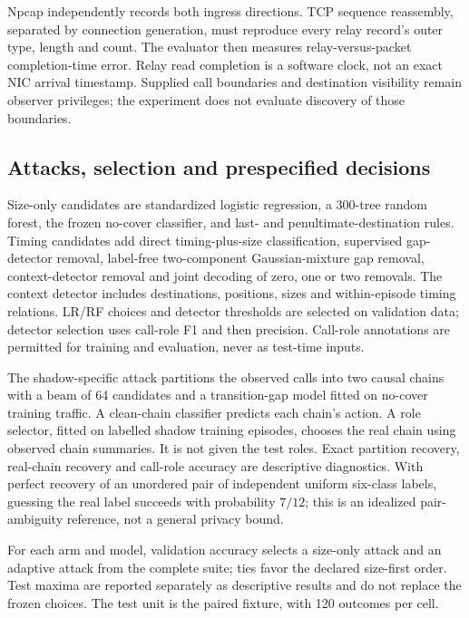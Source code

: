 Npcap independently records both ingress directions. TCP sequence reassembly, separated by connection generation, must reproduce every relay record's outer type, length and count. The evaluator then measures relay-versus-packet completion-time error. Relay read completion is a software clock, not an exact NIC arrival timestamp. Supplied call boundaries and destination visibility remain observer privileges; the experiment does not evaluate discovery of those boundaries.

\subsection{Attacks, selection and prespecified decisions}
Size-only candidates are standardized logistic regression, a 300-tree random forest, the frozen no-cover classifier, and last- and penultimate-destination rules. Timing candidates add direct timing-plus-size classification, supervised gap-detector removal, label-free two-component Gaussian-mixture gap removal, context-detector removal and joint decoding of zero, one or two removals. The context detector includes destinations, positions, sizes and within-episode timing relations. LR/RF choices and detector thresholds are selected on validation data; detector selection uses call-role F1 and then precision. Call-role annotations are permitted for training and evaluation, never as test-time inputs.

The shadow-specific attack partitions the observed calls into two causal chains with a beam of 64 candidates and a transition-gap model fitted on no-cover training traffic. A clean-chain classifier predicts each chain's action. A role selector, fitted on labelled shadow training episodes, chooses the real chain using observed chain summaries. It is not given the test roles. Exact partition recovery, real-chain recovery and call-role accuracy are descriptive diagnostics. With perfect recovery of an unordered pair of independent uniform six-class labels, guessing the real label succeeds with probability $7/12$; this is an idealized pair-ambiguity reference, not a general privacy bound.

For each arm and model, validation accuracy selects a size-only attack and an adaptive attack from the complete suite; ties favor the declared size-first order. Test maxima are reported separately as descriptive results and do not replace the frozen choices. The test unit is the paired fixture, with 120 outcomes per cell.


